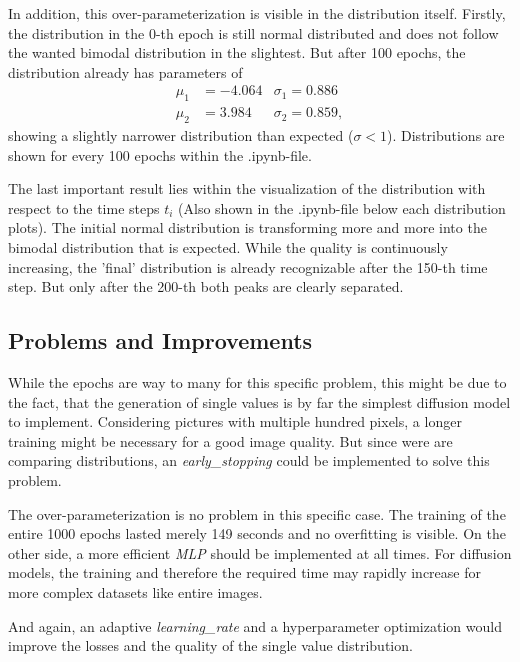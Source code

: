 In addition, this over-parameterization is visible in the distribution itself.
Firstly, the distribution in the 0-th epoch is still normal distributed and does not follow the wanted bimodal distribution in the slightest.
But after 100 epochs, the distribution already has parameters of
\begin{align*}
  \mu_1 &= -4.064 & \sigma_1 = 0.886\\
  \mu_2 &= 3.984 & \sigma_2 = 0.859,
\end{align*}
showing a slightly narrower distribution than expected ($\sigma < 1$). Distributions are shown for every 100 epochs within the .ipynb-file.

The last important result lies within the visualization of the distribution with respect to the time steps $t_i$ (Also shown in the .ipynb-file below each distribution plots).
The initial normal distribution is transforming more and more into the bimodal distribution that is expected.
While the quality is continuously increasing, the 'final' distribution is already recognizable after the 150-th time step. 
But only after the 200-th both peaks are clearly separated.

\subsection{Problems and Improvements}
While the epochs are way to many for this specific problem, this might be due to the fact, that the generation of single values is by far the simplest diffusion model to implement.
Considering pictures with multiple hundred pixels, a longer training might be necessary for a good image quality.
But since were are comparing distributions, an \textit{early\_stopping} could be implemented to solve this problem.

The over-parameterization is no problem in this specific case.
The training of the entire 1000 epochs lasted merely 149 seconds and no overfitting is visible.
On the other side, a more efficient \textit{MLP} should be implemented at all times. For diffusion models, the training and therefore the required time
may rapidly increase for more complex datasets like entire images.

And again, an adaptive \textit{learning\_rate} and a hyperparameter optimization would improve the losses and the quality of the single value distribution.
